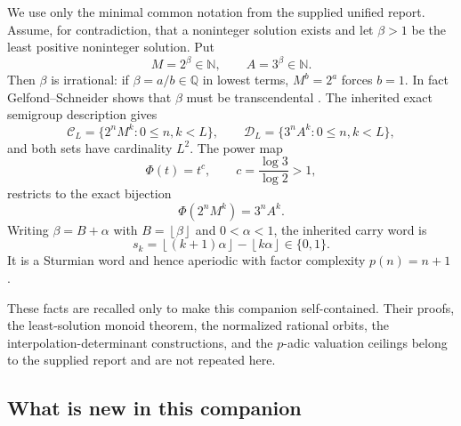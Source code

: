 \documentclass[11pt,oneside]{article}
\theoremstyle{definition}
\theoremstyle{remark}
\newcommand{\Q}{\mathbb{Q}}
\newcommand{\N}{\mathbb{N}}
\newcommand{\floor}[1]{\left\lfloor #1\right\rfloor}
\newcommand{\bits}{\{0,1\}}
\begin{document}
We use only the minimal common notation from the supplied unified report.  Assume, for contradiction, that a noninteger solution exists and let $\beta>1$ be the least positive noninteger solution.  Put
\begin{equation}\label{eq:MA}
  M=2^\beta\in\N,\qquad A=3^\beta\in\N.
\end{equation}
Then $\beta$ is irrational: if $\beta=a/b\in\Q$ in lowest terms, $M^b=2^a$ forces $b=1$.  In fact Gelfond--Schneider shows that $\beta$ must be transcendental \cite{Gelfond1960}.  The inherited exact semigroup description gives
\begin{equation}\label{eq:boxes}
  \mathcal C_L=\{2^nM^k:0\leq n,k<L\},\qquad
  \mathcal D_L=\{3^nA^k:0\leq n,k<L\},
\end{equation}
and both sets have cardinality $L^2$.  The power map
\begin{equation}\label{eq:power-conj}
  \Phi(t)=t^c,\qquad c=\frac{\log3}{\log2}>1,
\end{equation}
restricts to the exact bijection
\begin{equation}\label{eq:phi-box}
  \Phi(2^nM^k)=3^nA^k.
\end{equation}
Writing $\beta=B+\alpha$ with $B=\floor\beta$ and $0<\alpha<1$, the inherited carry word is
\begin{equation}\label{eq:sturmian}
  s_k=\floor{(k+1)\alpha}-\floor{k\alpha}\in\bits.
\end{equation}
It is a Sturmian word and hence aperiodic with factor complexity $p(n)=n+1$ \cite{Lothaire2002}.

These facts are recalled only to make this companion self-contained.  Their proofs, the least-solution monoid theorem, the normalized rational orbits, the interpolation-determinant constructions, and the $p$-adic valuation ceilings belong to the supplied report and are not repeated here.

\subsection{What is new in this companion}
\end{document}
